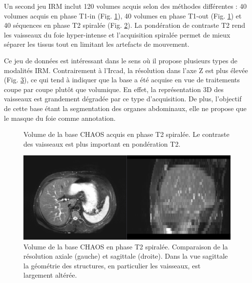 Un second jeu IRM inclut 120 volumes acquis selon des méthodes différentes : 40 volumes acquis en phase T1-in (Fig. \ref{fig:T1_MRI_2}), 40 volumes  en phase T1-out (Fig. \ref{fig:T1_MRI_2}) et 40 séquences en phase T2 spiralée (Fig. \ref{fig:T2_MRI}). La pondération de contraste T2 rend les vaisseaux du foie hyper-intense et l'acquisition spiralée permet de mieux séparer les tissus tout en limitant les artefacts de mouvement.
\begin{figure}
    \centering
    \caption{}
    \label{fig:T1_MRI_2}
\end{figure}

Ce jeu de données est intéressant dans le sens où il propose plusieurs types de modalités IRM. Contrairement à l'Ircad, la résolution dans l'axe Z est plus élevée (Fig. \ref{fig:CHAOS_geometry}), ce qui tend à indiquer que la base a été acquise en vue de traitements coupe par coupe plutôt que volumique. En effet, la représentation 3D des vaisseaux est grandement dégradée par ce type d'acquisition.  De plus, l'objectif de cette base étant la segmentation des organes abdominaux, elle ne propose que le masque du foie comme annotation.
\begin{figure}
    \centering
    \caption{Volume de la base CHAOS acquis en phase T2 spiralée. Le contraste des vaisseaux est plus important en pondération T2.}
    \label{fig:T2_MRI}
\end{figure}
\begin{figure}
    \centering
    \includegraphics[width=\textwidth]{Images/CHAOS_resolution.png}
    \caption{Volume de la base CHAOS en phase T2 spiralée. Comparaison de la résolution axiale (gauche) et sagittale (droite). Dans la vue sagittale la géométrie des structures, en particulier les vaisseaux, est largement altérée.}
    \label{fig:CHAOS_geometry}
\end{figure}
